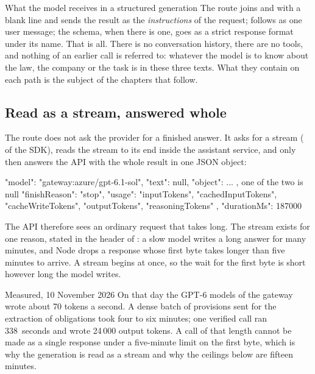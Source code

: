 \begin{aibox}{What the model receives in a structured generation}
The route joins  and  with a blank line and sends the result as
the \emph{instructions} of the request;  follows as one user message; the
schema, when there is one, goes as a strict response format under its name. That is all. There
is no conversation history, there are no tools, and nothing of an earlier call is referred to:
whatever the model is to know about the law, the company or the task is in these three texts.
What they contain on each path is the subject of the chapters that follow.
\end{aibox}

\subsection{Read as a stream, answered whole}

The route does not ask the provider for a finished answer. It asks for a stream
( of the SDK), reads the stream to its end inside the assistant service, and
only then answers the API with the whole result in one JSON object:

\begin{codeblock}
{ "model": "gateway:azure/gpt-6.1-sol",
  "text": null,  "object": { ... },      one of the two is null
  "finishReason": "stop",
  "usage": { "inputTokens", "cachedInputTokens", "cacheWriteTokens",
             "outputTokens", "reasoningTokens" },
  "durationMs": 187000 }
\end{codeblock}

The API therefore sees an ordinary request that takes long. The stream exists for one reason,
stated in the header of : a slow model writes a long answer for many
minutes, and Node drops a response whose first byte takes longer than five minutes to arrive.
A stream begins at once, so the wait for the first byte is short however long the model
writes.

\begin{lessonbox}{Measured, 10 November 2026}
On that day the GPT-6 models of the gateway wrote about 70 tokens a second. A dense batch of
provisions sent for the extraction of obligations took four to six minutes; one verified call
ran 338~seconds and wrote 24\,000 output tokens. A call of that length cannot be made as a
single response under a five-minute limit on the first byte, which is why the generation is
read as a stream and why the ceilings below are fifteen minutes.
\end{lessonbox}

